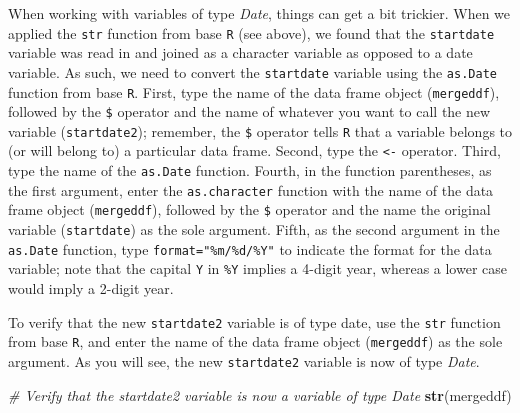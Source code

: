\documentclass[]{book}
\newenvironment{Shaded}{\begin{snugshade}}{\end{snugshade}}
\newcommand{\KeywordTok}[1]{\textcolor[rgb]{0.13,0.29,0.53}{\textbf{#1}}}
\newcommand{\DataTypeTok}[1]{\textcolor[rgb]{0.13,0.29,0.53}{#1}}
\newcommand{\StringTok}[1]{\textcolor[rgb]{0.31,0.60,0.02}{#1}}
\newcommand{\CommentTok}[1]{\textcolor[rgb]{0.56,0.35,0.01}{\textit{#1}}}
\newcommand{\OperatorTok}[1]{\textcolor[rgb]{0.81,0.36,0.00}{\textbf{#1}}}
\newcommand{\NormalTok}[1]{#1}
\begin{document}
When working with variables of type \emph{Date}, things can get a bit
trickier. When we applied the \texttt{str} function from base \texttt{R}
(see above), we found that the \texttt{startdate} variable was read in
and joined as a character variable as opposed to a date variable. As
such, we need to convert the \texttt{startdate} variable using the
\texttt{as.Date} function from base \texttt{R}. First, type the name of
the data frame object (\texttt{mergeddf}), followed by the \texttt{\$}
operator and the name of whatever you want to call the new variable
(\texttt{startdate2}); remember, the \texttt{\$} operator tells
\texttt{R} that a variable belongs to (or will belong to) a particular
data frame. Second, type the \texttt{\textless{}-} operator. Third, type
the name of the \texttt{as.Date} function. Fourth, in the function
parentheses, as the first argument, enter the \texttt{as.character}
function with the name of the data frame object (\texttt{mergeddf}),
followed by the \texttt{\$} operator and the name the original variable
(\texttt{startdate}) as the sole argument. Fifth, as the second argument
in the \texttt{as.Date} function, type \texttt{format="\%m/\%d/\%Y"} to
indicate the format for the data variable; note that the capital
\texttt{Y} in \texttt{\%Y} implies a 4-digit year, whereas a lower case
would imply a 2-digit year.

\begin{Shaded}
\end{Shaded}

To verify that the new \texttt{startdate2} variable is of type date, use
the \texttt{str} function from base \texttt{R}, and enter the name of
the data frame object (\texttt{mergeddf}) as the sole argument. As you
will see, the new \texttt{startdate2} variable is now of type
\emph{Date}.

\begin{Shaded}
\begin{Highlighting}[]
\CommentTok{# Verify that the startdate2 variable is now a variable of type Date}
\KeywordTok{str}\NormalTok{(mergeddf)}
\end{Highlighting}
\end{Shaded}
\end{document}
